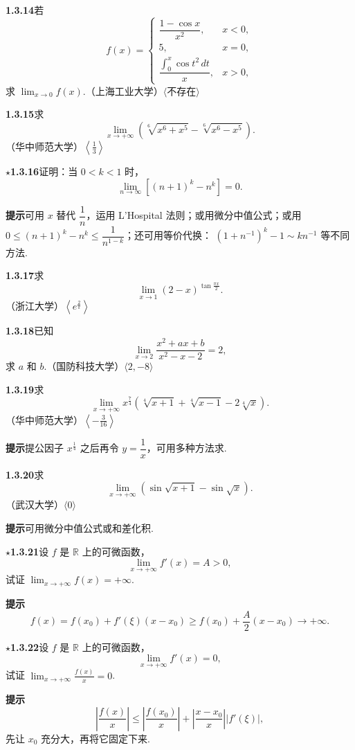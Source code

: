 \documentclass[UTF8,12pt,a4paper,fontset=fandol]{ctexart}
\begin{document}
\noindent\textbf{1.3.14}\quad 若
\[
  f(x)=
  \begin{cases}
    \dfrac{1-\cos x}{x^2}, & x<0,\\[6pt]
    5, & x=0,\\[6pt]
    \dfrac{\int_0^x\cos t^2\,dt}{x}, & x>0,
  \end{cases}
\]
求 $\displaystyle\lim_{x\to0}f(x)$.（上海工业大学）\quad $\langle\text{不存在}\rangle$

\noindent\textbf{1.3.15}\quad 求
\[
  \lim_{x\to+\infty}\left(\sqrt[6]{x^6+x^5}-\sqrt[6]{x^6-x^5}\right).
\]
（华中师范大学）\quad $\left\langle\frac13\right\rangle$

\noindent\textbf{$\star$1.3.16}\quad 证明：当 $0<k<1$ 时，
\[
  \lim_{n\to\infty}[(n+1)^k-n^k]=0.
\]

\noindent\textbf{提示}\quad 可用 $x$ 替代 $\dfrac1n$，运用 L'Hospital 法则；或用微分中值公式；或用
$0\le(n+1)^k-n^k\le\dfrac1{n^{1-k}}$；还可用等价代换：
$(1+n^{-1})^k-1\sim kn^{-1}$ 等不同方法.

\noindent\textbf{1.3.17}\quad 求
\[
  \lim_{x\to1}(2-x)^{\tan\frac{\pi x}{2}}.
\]
（浙江大学）\quad $\left\langle e^{\frac2\pi}\right\rangle$

\noindent\textbf{1.3.18}\quad 已知
\[
  \lim_{x\to2}\frac{x^2+ax+b}{x^2-x-2}=2,
\]
求 $a$ 和 $b$.（国防科技大学）\quad $\langle2,-8\rangle$

\noindent\textbf{1.3.19}\quad 求
\[
  \lim_{x\to+\infty}x^{\frac74}\left(\sqrt[4]{x+1}+\sqrt[4]{x-1}-2\sqrt[4]{x}\right).
\]
（华中师范大学）\quad $\left\langle-\frac3{16}\right\rangle$

\noindent\textbf{提示}\quad 提公因子 $x^{\frac14}$ 之后再令 $y=\dfrac1x$，可用多种方法求.

\noindent\textbf{1.3.20}\quad 求
\[
  \lim_{x\to+\infty}(\sin\sqrt{x+1}-\sin\sqrt{x}).
\]
（武汉大学）\quad $\langle0\rangle$

\noindent\textbf{提示}\quad 可用微分中值公式或和差化积.

\noindent\textbf{$\star$1.3.21}\quad 设 $f$ 是 $\mathbb R$ 上的可微函数，
\[
  \lim_{x\to+\infty}f'(x)=A>0,
\]
试证 $\displaystyle\lim_{x\to+\infty}f(x)=+\infty$.

\noindent\textbf{提示}\quad
\[
  f(x)=f(x_0)+f'(\xi)(x-x_0)\ge f(x_0)+\frac A2(x-x_0)\to+\infty.
\]

\noindent\textbf{$\star$1.3.22}\quad 设 $f$ 是 $\mathbb R$ 上的可微函数，
\[
  \lim_{x\to+\infty}f'(x)=0,
\]
试证 $\displaystyle\lim_{x\to+\infty}\frac{f(x)}x=0$.

\noindent\textbf{提示}\quad
\[
  \left|\frac{f(x)}x\right|\le
  \left|\frac{f(x_0)}x\right|+
  \left|\frac{x-x_0}{x}\right||f'(\xi)|,
\]
先让 $x_0$ 充分大，再将它固定下来.
\end{document}
